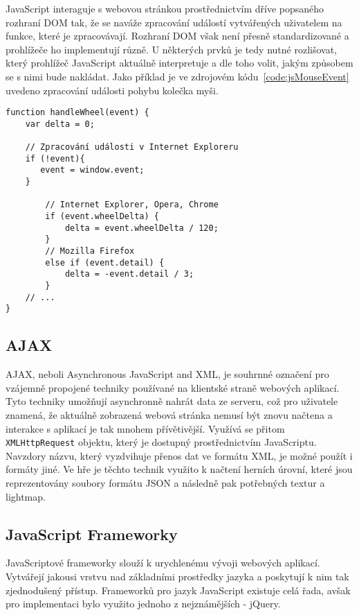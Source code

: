 JavaScript interaguje s webovou stránkou prostřednictvím dříve popsaného rozhraní DOM tak, že se naváže zpracování událostí vytvářených uživatelem na funkce, které je zpracovávají. Rozhraní DOM však není přesně standardizované a prohlížeče ho implementují různě. U některých prvků je tedy nutné rozlišovat, který prohlížeč JavaScript aktuálně interpretuje a dle toho volit, jakým způsobem se s nimi bude nakládat. Jako příklad je ve zdrojovém kódu~\ref{code:jsMouseEvent} uvedeno zpracování události pohybu kolečka myši.

\begin{lstlisting}[caption=Zpracování události pohybu kolečka myši,label=code:jsMouseEvent]
function handleWheel(event) {
    var delta = 0;
    
    // Zpracování události v Internet Exploreru
    if (!event){
       event = window.event;
    }
	
		// Internet Explorer, Opera, Chrome
		if (event.wheelDelta) {
	    	delta = event.wheelDelta / 120;
		}
		// Mozilla Firefox
		else if (event.detail) {
	    	delta = -event.detail / 3;
		}
    // ...
}
\end{lstlisting}

\subsection*{AJAX}
\label{subsection:AJAX}
AJAX, neboli Asynchronous JavaScript and XML, je souhrnné označení pro vzájemně propojené techniky používané na klientské straně webových aplikací. Tyto techniky umožňují asynchronně nahrát data ze serveru, což pro uživatele znamená, že aktuálně zobrazená webová stránka nemusí být znovu načtena a interakce s aplikací je tak mnohem přívětivější. Využívá se přitom \texttt{XMLHttpRequest} objektu, který je dostupný prostřednictvím JavaScriptu. Navzdory názvu, který vyzdvihuje přenos dat ve formátu XML, je možné použít i formáty jiné. Ve hře je těchto technik využito k načtení herních úrovní, které jsou reprezentovány soubory formátu JSON a následně pak potřebných textur a lightmap. 


\subsection*{JavaScript Frameworky}
\label{subsection:jsFrameworky}
JavaScriptové frameworky slouží k urychlenému vývoji webových aplikací. Vytvářejí jakousi vrstvu nad základními prostředky jazyka a poskytují k nim tak zjednodušený přístup. Frameworků pro jazyk JavaScript existuje celá řada, avšak pro implementaci bylo využito jednoho z nejznámějších - jQuery.

